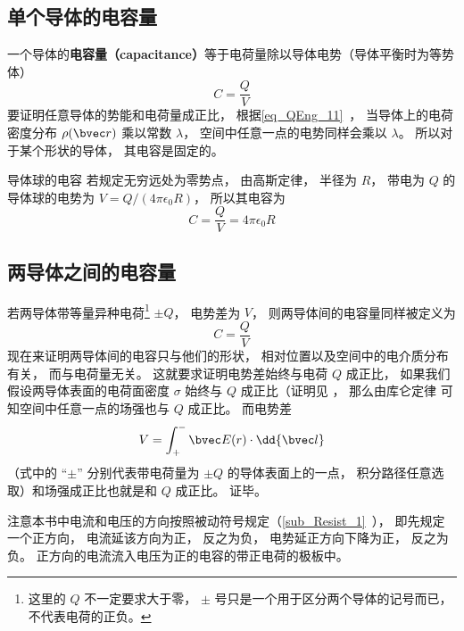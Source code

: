 

\subsection{单个导体的电容量}

一个导体的\textbf{电容量（capacitance）}等于电荷量除以导体电势（导体平衡时为等势体）
\begin{equation}\label{eq_Cpctor_2}
C = \frac{Q}{V}
\end{equation}
要证明任意导体的势能和电荷量成正比， 根据\autoref{eq_QEng_11}~， 当导体上的电荷密度分布 $\rho(\bvec r)$ 乘以常数 $\lambda$， 空间中任意一点的电势同样会乘以 $\lambda$。 所以对于某个形状的导体， 其电容是固定的。

\begin{example}{导体球的电容}\label{ex_Cpctor_1}
若规定无穷远处为零势点， 由高斯定律， 半径为 $R$， 带电为 $Q$ 的导体球的电势为 $V = Q/(4\pi\epsilon_0 R)$， 所以其电容为
\begin{equation}\label{eq_Cpctor_1}
C = \frac{Q}{V} = 4\pi\epsilon_0 R
\end{equation}
\end{example}

\subsection{两导体之间的电容量}
若两导体带等量异种电荷\footnote{这里的 $Q$ 不一定要求大于零， $\pm$ 号只是一个用于区分两个导体的记号而已， 不代表电荷的正负。} $\pm Q$， 电势差为 $V$， 则两导体间的电容量同样被定义为
\begin{equation}
C = \frac{Q}{V}
\end{equation}
现在来证明两导体间的电容只与他们的形状， 相对位置以及空间中的电介质分布有关， 而与电荷量无关。 这就要求证明电势差始终与电荷 $Q$ 成正比， 如果我们假设两导体表面的电荷面密度 $\sigma$ 始终与 $Q$ 成正比（证明见%
， 那么由库仑定律%
可知空间中任意一点的场强也与 $Q$ 成正比。 而电势差
\begin{equation}
V = \int_+^- \bvec E(r) \cdot \dd{\bvec l}
\end{equation}
（式中的 “$\pm$” 分别代表带电荷量为 $\pm Q$ 的导体表面上的一点， 积分路径任意选取）和场强成正比也就是和 $Q$ 成正比。 证毕。

注意本书中电流和电压的方向按照被动符号规定（\autoref{sub_Resist_1}~）， 即先规定一个正方向， 电流延该方向为正， 反之为负， 电势延正方向下降为正， 反之为负。 正方向的电流流入电压为正的电容的带正电荷的极板中。

